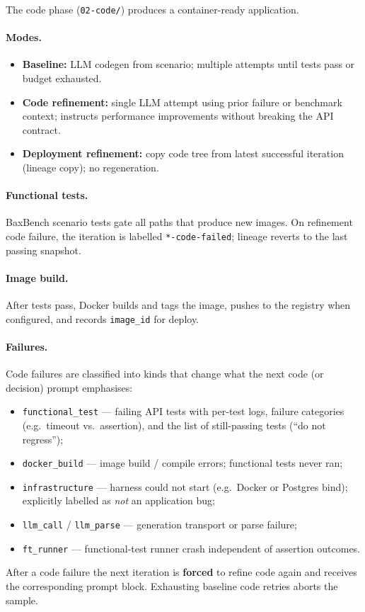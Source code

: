 The code phase (\texttt{02-code/}) produces a container-ready application.

\paragraph{Modes.}
\begin{itemize}
  \item \textbf{Baseline:} LLM codegen from scenario; multiple attempts until
        tests pass or budget exhausted.
  \item \textbf{Code refinement:} single LLM attempt using prior failure or
        benchmark context; instructs performance improvements without breaking
        the API contract.
  \item \textbf{Deployment refinement:} copy code tree from latest successful
        iteration (lineage copy); no regeneration.
\end{itemize}

\paragraph{Functional tests.}
BaxBench scenario tests gate all paths that produce new images.  On
refinement code failure, the iteration is labelled \texttt{*-code-failed};
lineage reverts to the last passing snapshot.

\paragraph{Image build.}
After tests pass, Docker builds and tags the image, pushes to the registry when
configured, and records \texttt{image\_id} for deploy.

\paragraph{Failures.}
Code failures are classified into kinds that change what the next code (or
decision) prompt emphasises:
\begin{itemize}
  \item \texttt{functional\_test} --- failing API tests with per-test logs,
        failure categories (e.g.\ timeout vs.\ assertion), and the list of
        still-passing tests (``do not regress'');
  \item \texttt{docker\_build} --- image build / compile errors; functional
        tests never ran;
  \item \texttt{infrastructure} --- harness could not start (e.g.\ Docker or
        Postgres bind); explicitly labelled as \emph{not} an application bug;
  \item \texttt{llm\_call} / \texttt{llm\_parse} --- generation transport or
        parse failure;
  \item \texttt{ft\_runner} --- functional-test runner crash independent of
        assertion outcomes.
\end{itemize}
After a code failure the next iteration is \textbf{forced} to refine code again
and receives the corresponding prompt block.  Exhausting baseline code retries
aborts the sample.


